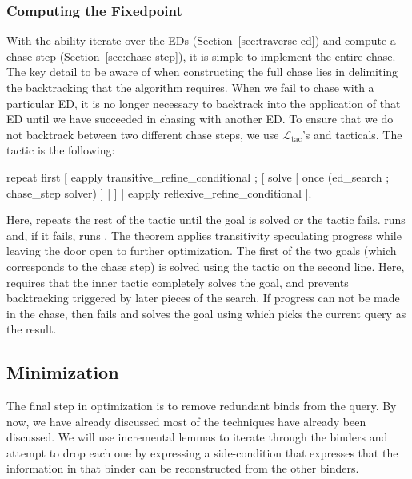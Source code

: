 \documentclass[preprint]{sigplanconf}
\newcommand{\ltac}[0]{\ensuremath{\mathcal{L}_{\mathrm{tac}}}}
\begin{document}
\subsubsection{Computing the Fixedpoint}
With the ability iterate over the EDs (Section~\ref{sec:traverse-ed}) and compute a chase step (Section~\ref{sec:chase-step}), it is simple to implement the entire chase.
The key detail to be aware of when constructing the full chase lies in delimiting the backtracking that the algorithm requires.
When we fail to chase with a particular ED, it is no longer necessary to backtrack into the application of that ED until we have succeeded in chasing with another ED.
To ensure that we do not backtrack between two different chase steps, we use \ltac's  and  tacticals.
The tactic is the following:
\begin{coq}
repeat first
   [ eapply transitive_refine_conditional ;
     [ solve [ once (ed_search ; chase_step solver) ]
     | ]
   | eapply reflexive_refine_conditional ].
\end{coq}
Here,  repeats the rest of the tactic until the goal is solved or the tactic fails.
 runs  and, if it fails, runs .
The  theorem applies transitivity speculating progress while leaving the door open to further optimization.
The first of the two goals (which corresponds to the chase step) is solved using the tactic on the second line.
Here,  requires that the inner tactic completely solves the goal, and  prevents backtracking triggered by later pieces of the search.
If progress can not be made in the chase, then  fails and  solves the goal using  which picks the current query as the result.


\subsection{Minimization}
\label{sec:minimization}

The final step in optimization is to remove redundant binds from the query.
By now, we have already discussed most of the techniques have already been discussed.
We will use incremental lemmas to iterate through the binders and attempt to drop each one by expressing a side-condition that expresses that the information in that binder can be reconstructed from the other binders.
\end{document}
